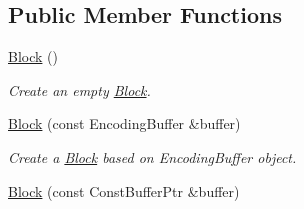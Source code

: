\subsection*{Public Member Functions}
\begin{DoxyCompactItemize}
\item 
\hyperlink{classndn_1_1Block_af56e7495815f8101b68c388dee5fcd6a}{Block} ()\hypertarget{classndn_1_1Block_af56e7495815f8101b68c388dee5fcd6a}{}\label{classndn_1_1Block_af56e7495815f8101b68c388dee5fcd6a}

\begin{DoxyCompactList}\small\item\em Create an empty \hyperlink{classndn_1_1Block}{Block}. \end{DoxyCompactList}\item 
\hyperlink{classndn_1_1Block_a58577a748aca79b32689b89b94fe0f51}{Block} (const Encoding\+Buffer \&buffer)\hypertarget{classndn_1_1Block_a58577a748aca79b32689b89b94fe0f51}{}\label{classndn_1_1Block_a58577a748aca79b32689b89b94fe0f51}

\begin{DoxyCompactList}\small\item\em Create a \hyperlink{classndn_1_1Block}{Block} based on Encoding\+Buffer object. \end{DoxyCompactList}\item 
\hyperlink{classndn_1_1Block_aa6d75dc5f772c8e46067965906b05fca}{Block} (const Const\+Buffer\+Ptr \&buffer)\hypertarget{classndn_1_1Block_aa6d75dc5f772c8e46067965906b05fca}{}\label{classndn_1_1Block_aa6d75dc5f772c8e46067965906b05fca}


\end{DoxyCompactItemize}
